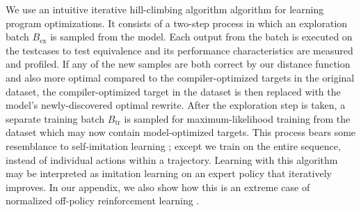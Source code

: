 \documentclass{article}
\begin{document}
We use an intuitive iterative hill-climbing algorithm algorithm for learning program optimizations. It consists of a two-step process in which an exploration batch $B_{\mathrm{ex}}$ is sampled from the model. Each output from the batch is executed on the testcases to test equivalence and its performance characteristics are measured and profiled. If any of the new samples are both correct by our distance function and also more optimal compared to the compiler-optimized targets in the original dataset, the compiler-optimized target in the dataset is then replaced with the model's newly-discovered optimal rewrite. After the exploration step is taken, a separate training batch $B_{\mathrm{tr}}$ is sampled for maximum-likelihood training from the dataset which may now contain model-optimized targets. This process bears some resemblance to self-imitation learning \cite{oh2018self}; except we train on the entire sequence, instead of individual actions within a trajectory. Learning with this algorithm may be interpreted as imitation learning on an expert policy that iteratively improves. In our appendix, we also show how this is an extreme case of normalized off-policy reinforcement learning . 
\end{document}
